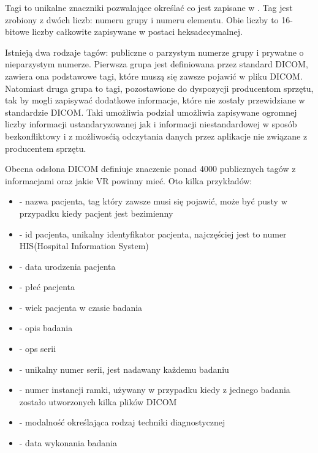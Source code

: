 Tagi to unikalne znaczniki pozwalające określać co jest zapisane w .
Tag jest zrobiony z dwóch liczb: numeru grupy i numeru elementu.
Obie liczby to 16-bitowe liczby całkowite zapisywane w postaci  heksadecymalnej.

Istnieją dwa rodzaje tagów: publiczne o parzystym numerze grupy i prywatne o nieparzystym numerze.
Pierwsza grupa jest definiowana przez standard DICOM, zawiera ona podstawowe tagi, które muszą się zawsze pojawić w pliku DICOM.
Natomiast druga grupa to tagi, pozostawione do dyspozycji producentom sprzętu, tak by mogli zapisywać dodatkowe informacje, które nie zostały przewidziane w standardzie DICOM.
Taki umożliwia podział umożliwia zapisywane ogromnej liczby informacji ustandaryzowanej jak i informacji niestandardowej w sposób bezkonfliktowy i z możliwosćią odczytania danych przez aplikacje nie związane z producentem sprzętu.

Obecna odsłona DICOM definiuje znaczenie ponad 4000 publicznych tagów z informacjami oraz jakie VR powinny mieć.
Oto kilka przykładów:
\begin{itemize}
    \item {} - nazwa pacjenta, tag który zawsze musi się pojawić, może być pusty w przypadku kiedy pacjent jest bezimienny

    \item {} - id pacjenta, unikalny identyfikator pacjenta, najczęściej jest to numer HIS(Hospital Information System)

    \item {} - data urodzenia pacjenta

    \item {} - płeć pacjenta

    \item {} - wiek pacjenta w czasie badania

    \item {} - opis badania

    \item {} - ops serii

    \item {} - unikalny numer serii, jest nadawany każdemu badaniu

    \item {} - numer instancji ramki, używany w przypadku kiedy z jednego badania zostało utworzonych kilka plików DICOM

    \item {} - modalność określająca rodzaj techniki diagnostycznej

    \item {} - data wykonania badania
\end{itemize}


